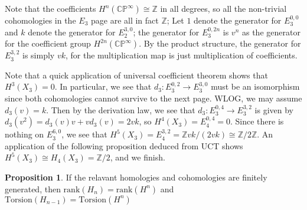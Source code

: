 \documentclass{article}
\theoremstyle{definition}
\theoremstyle{definition}
\newtheorem{proposition}{Proposition}[theorem]
\theoremstyle{definition}
\theoremstyle{definition}
\theoremstyle{definition}
\theoremstyle{definition}
\begin{document}
Note that the coefficients $H^n(\mathbb{CP}^{\infty})\cong \mathbb{Z}$ in all degrees, so all the non-trivial cohomologies in the $E_3$ page are all in fact $\mathbb{Z}$; Let $1$ denote the generator for $E_3^{0,0}$ and $k$ denote the generator for $E_2^{3,0}$; the generator for $E_3^{0,2n}$ is $v^n$ as the generator for the coefficient group $H^{2n}(\mathbb{CP}^{\infty})$. By the product structure, the generator for $E_3^{3,2}$ is simply $vk$, for the multiplication map is just multiplication of coefficients.


Note that a quick application of universal coefficient theorem shows that $H^3(X_3)=0$. In particular, we see that $d_3: E_3^{0,2}\to E_3^{3,0}$ must be an isomorphism since both cohomologies cannot survive to the next page. WLOG, we may assume $d_3(v)=k$. Then by the derivation law, we see that $d_3: E_3^{0,4}\to E_3^{3,2}$ is given by $d_3(v^2)=d_3(v)v+vd_3(v)=2vk$, so $H^4(X_3)=E_4^{0,4}=0$. Since there is nothing on $E_3^{6,0}$, we see that $H^5(X_3)=E_4^{3,2}=\mathbb{Z}vk/(2vk)\cong \mathbb{Z}/2 \mathbb{Z}$. An application of the following proposition deduced from UCT shows $H^5(X_3)\cong H_4(X_3)=\mathbb{Z}/2$, and we finish.
	

\begin{tcolorbox}[colback=blue!5!white,colframe=blue!30!white]
\begin{proposition}
	If the relavant homologies and cohomologies are finitely generated, then $\textrm{rank}(H_n)=\textrm{rank}(H^n)$ and $\textrm{Torsion}(H_{n-1})=\textrm{Torsion}(H^n)$
\end{proposition}
\end{tcolorbox}
	
\end{document}
